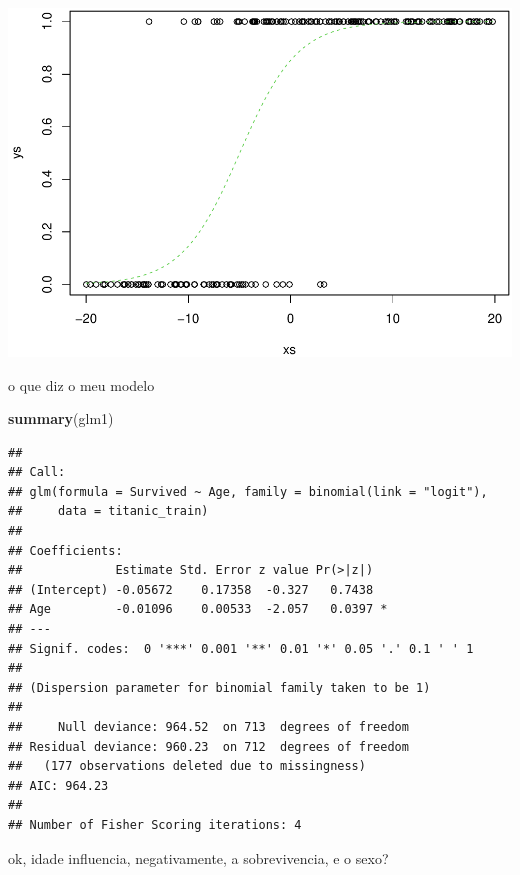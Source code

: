 \documentclass[
]{book}
\newenvironment{Shaded}{\begin{snugshade}}{\end{snugshade}}
\newcommand{\FunctionTok}[1]{\textcolor[rgb]{0.13,0.29,0.53}{\textbf{#1}}}
\newcommand{\NormalTok}[1]{#1}
\begin{document}
\includegraphics{ECOMODbook_files/figure-latex/unnamed-chunk-31-1.pdf}

o que diz o meu modelo

\begin{Shaded}
\begin{Highlighting}[]
\FunctionTok{summary}\NormalTok{(glm1)}
\end{Highlighting}
\end{Shaded}

\begin{verbatim}
## 
## Call:
## glm(formula = Survived ~ Age, family = binomial(link = "logit"), 
##     data = titanic_train)
## 
## Coefficients:
##             Estimate Std. Error z value Pr(>|z|)  
## (Intercept) -0.05672    0.17358  -0.327   0.7438  
## Age         -0.01096    0.00533  -2.057   0.0397 *
## ---
## Signif. codes:  0 '***' 0.001 '**' 0.01 '*' 0.05 '.' 0.1 ' ' 1
## 
## (Dispersion parameter for binomial family taken to be 1)
## 
##     Null deviance: 964.52  on 713  degrees of freedom
## Residual deviance: 960.23  on 712  degrees of freedom
##   (177 observations deleted due to missingness)
## AIC: 964.23
## 
## Number of Fisher Scoring iterations: 4
\end{verbatim}

ok, idade influencia, negativamente, a sobrevivencia, e o sexo?
\end{document}
